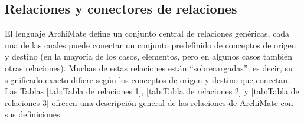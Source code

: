 
\subsection{Relaciones y conectores de relaciones}
El lenguaje ArchiMate define un conjunto central de relaciones genéricas, cada una de las cuales puede conectar un conjunto predefinido de conceptos de origen y destino (en la mayoría de los casos, elementos, pero en algunos casos también otras relaciones). Muchas de estas relaciones están “sobrecargadas”; es decir, su significado exacto difiere según los conceptos de origen y destino que conectan. Las Tablas \ref{tab:Tabla de relaciones 1}, \ref{tab:Tabla de relaciones 2} y \ref{tab:Tabla de relaciones 3} ofrecen una descripción general de las relaciones de ArchiMate con sus definiciones. \cite{archimate} 

